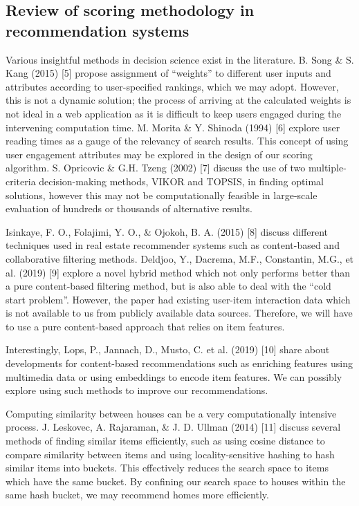 \documentclass[a4paper, 11pt]{article}
\begin{document}
    \subsection{Review of scoring methodology in recommendation systems}
    Various insightful methods in decision science exist in the literature. B. Song \& S. Kang (2015) [5] propose assignment of “weights” to different user inputs and attributes according to user-specified rankings, which we may adopt. However, this is not a dynamic solution; the process of arriving at the calculated weights is not ideal in a web application as it is difficult to keep users engaged during the intervening computation time. M. Morita \& Y. Shinoda (1994) [6] explore user reading times as a gauge of the relevancy of search results. This concept of using user engagement attributes may be explored in the design of our scoring algorithm. S. Opricovic \& G.H. Tzeng (2002) [7] discuss the use of two multiple-criteria decision-making methods, VIKOR and TOPSIS, in finding optimal solutions, however this may not be computationally feasible in large-scale evaluation of hundreds or thousands of alternative results.

    Isinkaye, F. O., Folajimi, Y. O., \& Ojokoh, B. A. (2015) [8] discuss different techniques used in real estate recommender systems such as content-based and collaborative filtering methods. Deldjoo, Y., Dacrema, M.F., Constantin, M.G., et al. (2019) [9] explore a novel hybrid method which not only performs better than a pure content-based filtering method, but is also able to deal with the “cold start problem”. However, the paper had existing user-item interaction data which is not available to us from publicly available data sources. Therefore, we will have to use a pure content-based approach that relies on item features.

    Interestingly, Lops, P., Jannach, D., Musto, C. et al. (2019) [10] share about developments for content-based recommendations such as enriching features using multimedia data or using embeddings to encode item features. We can possibly explore using such methods to improve our recommendations.

    Computing similarity between houses can be a very computationally intensive process. J. Leskovec, A. Rajaraman, \& J. D. Ullman (2014) [11] discuss several methods of finding similar items efficiently, such as using cosine distance to compare similarity between items and using locality-sensitive hashing to hash similar items into buckets. This effectively reduces the search space to items which have the same bucket. By confining our search space to houses within the same hash bucket, we may recommend homes more efficiently.
\end{document}
